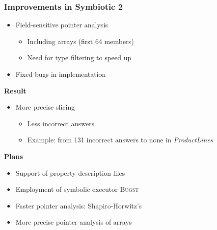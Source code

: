 \documentclass[xcolor=dvipsnames]{beamer}
\newcommand{\heading}[1]{\textbf{\textcolor{BurntOrange}{#1}}}
\begin{document}
\begin{frame}
  \frametitle{Improvements in Symbiotic 2}

  \begin{itemize}
    \item Field-sensitive pointer analysis
    \begin{itemize}
      \item Including arrays (first 64 members) 
      \pause
      \item Need for type filtering to speed up
    \end{itemize}

    \pause

    \item Fixed bugs in implementation
  \end{itemize}

  \pause
  \bigskip

  \heading{Result}
  \begin{itemize}
    \item More precise slicing
    \begin{itemize}
      \item Less incorrect answers
      \item Example: from 131 incorrect answers to none in \textit{ProductLines}
    \end{itemize}
  \end{itemize}

  \pause
  \bigskip

  \heading{Plans}
  \begin{itemize}
    \item Support of property description files

    \pause

    \item Employment of symbolic executor \textsc{Bugst}

    \pause

    \item Faster pointer analysis: Shapiro-Horwitz's

    \pause

    \item More precise pointer analysis of arrays
  \end{itemize}

\end{frame}
\end{document}
